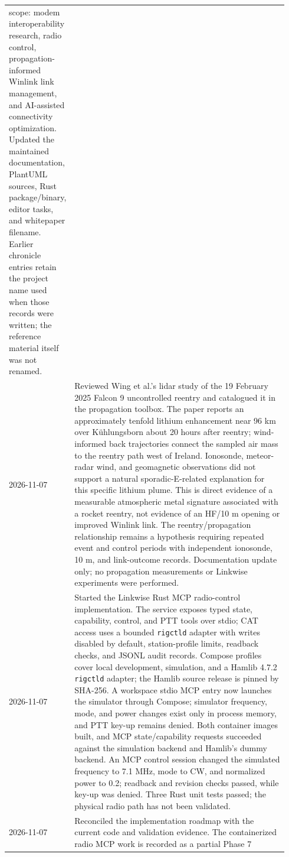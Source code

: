 \documentclass[11pt,a4paper]{article}
\begin{document}
\begin{longtable}{p{0.15\linewidth}p{0.79\linewidth}}
scope: modem interoperability research, radio control, propagation-informed
Winlink link management, and AI-assisted connectivity optimization. Updated
the maintained documentation, PlantUML sources, Rust package/binary, editor
tasks, and whitepaper filename. Earlier chronicle entries retain the project
name used when those records were written; the reference material itself was
not renamed. \\
2026-11-07 &
Reviewed Wing et al.'s lidar study of the 19 February 2025 Falcon 9
uncontrolled reentry and catalogued it in the propagation toolbox. The paper
reports an approximately tenfold lithium enhancement near 96 km over
K\"uhlungsborn about 20 hours after reentry; wind-informed back trajectories
connect the sampled air mass to the reentry path west of Ireland. Ionosonde,
meteor-radar wind, and geomagnetic observations did not support a natural
sporadic-E-related explanation for this specific lithium plume. This is direct
evidence of a measurable atmospheric metal signature associated with a rocket
reentry, not evidence of an HF/10 m opening or improved Winlink link. The
reentry/propagation relationship remains a hypothesis requiring repeated
event and control periods with independent ionosonde, 10 m, and link-outcome
records. Documentation update only; no propagation measurements or Linkwise
experiments were performed. \\
2026-11-07 &
Started the Linkwise Rust MCP radio-control implementation. The service exposes
typed state, capability, control, and PTT tools over stdio; CAT access uses a
bounded \texttt{rigctld} adapter with writes disabled by default, station-profile
limits, readback checks, and JSONL audit records. Compose profiles cover local
development, simulation, and a Hamlib 4.7.2 \texttt{rigctld} adapter; the Hamlib
source release is pinned by SHA-256. A workspace stdio MCP entry now launches
the simulator through Compose; simulator frequency, mode, and power changes
exist only in process memory, and PTT key-up remains denied. Both
container images built, and MCP state/capability requests succeeded against
the simulation backend and Hamlib's dummy backend. An MCP control session
changed the simulated frequency to 7.1 MHz, mode to CW, and normalized power
to 0.2; readback and revision checks passed, while key-up was denied. Three
Rust unit tests passed; the physical radio path has not been validated. \\
2026-11-07 &
Reconciled the implementation roadmap with the current code and validation
evidence. The containerized radio MCP work is recorded as a partial Phase 7

\end{longtable}
\end{document}
